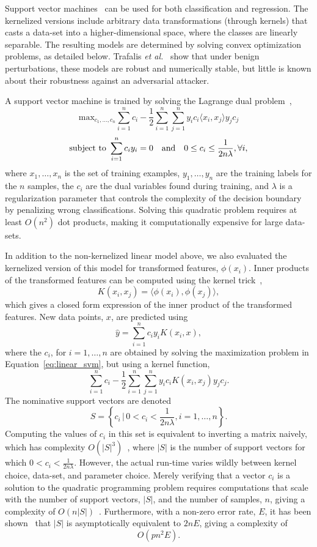 \documentclass[fonts]{icst}
\begin{document}
Support vector machines~\cite{cortes1995support} can be used for both classification and regression.
The kernelized versions include arbitrary data transformations (through kernels) that casts a data-set into a higher-dimensional space, where the classes are linearly separable.
The resulting models are determined by solving convex optimization problems, as detailed below.
Trafalis \textit{et al.}~\cite{trafalis2007robust} show that under benign perturbations, these models are robust and numerically stable, but little is known about their robustness against an adversarial attacker.

A support vector machine is trained by solving the Lagrange dual problem~\cite{cortes1995support},
\begin{equation}
    \textrm{max}_{c_1,\ldots,c_n}
    \sum_{i = 1}^n c_i - \frac{1}{2} \sum_{i = 1}^n \sum_{j = 1}^n y_i c_i \langle x_i, x_j \rangle y_j c_j
    \label{eq:linear_svm}
\end{equation}
$$
    \textrm{subject to } \sum_{i = 1}^n c_i y_i = 0 \textrm{\quad and\quad} 0 \leq c_i \leq \frac{1}{2n\lambda}, \forall i,
$$
where $x_1,\ldots,x_n$ is the set of training examples, $y_1,\ldots,y_n$ are the training labels for the $n$ samples, the $c_i$ are the dual variables found during training, and $\lambda$ is a regularization parameter that controls the complexity of the decision boundary by penalizing wrong classifications.
Solving this quadratic problem requires at least $O(n^2)$ dot products, making it computationally expensive for large data-sets.

In addition to the non-kernelized linear model above, we also evaluated the kernelized version of this model for transformed features, $\phi(x_i)$.
Inner products of the transformed features can be computed using the kernel trick~\cite{cortes1995support},
$$
    K(x_i, x_j) = \langle\phi(x_i), \phi(x_j)\rangle,
$$
which gives a closed form expression of the inner product of the transformed features.
New data points, $x$, are predicted using
$$
    \hat{y} = \sum_{i = 1}^n c_i y_i K(x_i, x),
$$
where the $c_i$, for $i=1,\ldots,n$ are obtained by solving the maximization problem in Equation~\ref{eq:linear_svm}, but using a kernel function,
$$
    \sum_{i = 1}^n c_i - \frac{1}{2} \sum_{i=1}^n \sum_{j = 1}^n y_i c_i K(x_i, x_j) y_j c_j.
$$
The nominative support vectors are denoted
$$
    S = \left\{c_i \,\big|\, 0 < c_i < \frac{1}{2n\lambda}, i=1,\ldots,n\right\}.
$$
Computing the values of $c_i$ in this set is equivalent to inverting a matrix naively, which has complexity $O(|S|^3)$~\cite{bordes2005fast}, where $|S|$ is the number of support vectors for which $0 < c_i < \frac{1}{2n\lambda}$.
However, the actual run-time varies wildly between kernel choice, data-set, and parameter choice.
Merely verifying that a vector $c_i$ is a solution to the quadratic programming problem requires computations that scale with the number of support vectors, $|S|$, and the number of samples, $n$, giving a complexity of $O(n|S|)$~\cite{mehmood2015svm}.
Furthermore, with a non-zero error rate, $E$, it has been shown~\cite{christmann2004robustness} that $|S|$ is asymptotically equivalent to $2nE$, giving a  complexity of
$$
    O(pn^2E).
$$
\end{document}
